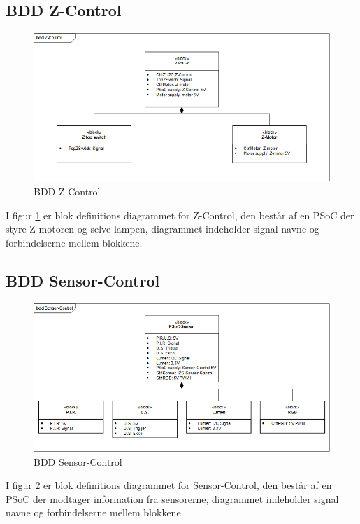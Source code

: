 \subsection{BDD Z-Control}
\begin{figure}[H] \centering
    \includegraphics[width=\textwidth]{0_Filer/Figuer/5_HW_Design/bddPSoC2vers2.png}
    \caption{BDD Z-Control}
    \label{fig:bddZ}
\end{figure}
I figur \ref{fig:bddZ} er blok definitions diagrammet for Z-Control, den består af en PSoC der styre Z motoren og selve lampen, diagrammet indeholder signal navne og forbindelserne mellem blokkene.

\subsection{BDD Sensor-Control}
\begin{figure}[H] \centering
    \includegraphics[width=\textwidth]{0_Filer/Figuer/5_HW_Design/bddPSoC3vers2.png}
    \caption{BDD Sensor-Control}
    \label{fig:bddSensor}
\end{figure}
I figur \ref{fig:bddSensor} er blok definitions diagrammet for Sensor-Control, den består af en PSoC der modtager information fra sensorerne, diagrammet indeholder signal navne og forbindelserne mellem blokkene.

